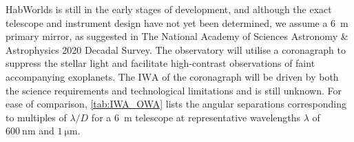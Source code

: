 \documentclass[
    usenatbib,
]{mnras}
\newcommand{\IWA}{\ensuremath{\mathrm{IWA}}}
\newcommand{\hwo}{HabWorlds}
\begin{document}
\hwo{} is still in the early stages of development, and although the exact telescope and instrument design have not yet been determined, we assume a \qty{6}{\meter} primary mirror, as suggested in The National Academy of Sciences Astronomy \& Astrophysics 2020 Decadal Survey.
%
The observatory will utilise a coronagraph to suppress the stellar light and facilitate high-contrast observations of faint accompanying exoplanets. 
%
The \IWA{} of the coronagraph will be driven by both the science requirements and technological limitations and is still unknown.
For ease of comparison, \cref{tab:IWA_OWA} lists the angular separations corresponding to multiples of $\lambda / D$ for a \qty{6}{\meter} telescope at representative wavelengths $\lambda$ of $\qty{600}{\nano\meter}$ and $\qty{1}{\micro\meter}$.
\end{document}
